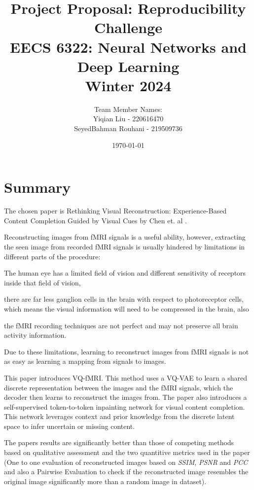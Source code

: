 \documentclass[11pt,a4paper]{article}
\title{Project Proposal: Reproducibility Challenge \\ \large EECS 6322: Neural Networks and Deep Learning \\ Winter 2024}
\author{Team Member Names: \\
        Yiqian Liu - 220616470 \\
        SeyedBahman Rouhani - 219509736}
\date{\today}
\begin{document}
\maketitle

\section*{Summary}
The chosen paper is Rethinking Visual Reconstruction: Experience-Based Content Completion
Guided by Visual Cues by Chen et. al \cite{chen2023rethinking}.

Reconstructing images from fMRI signals is a useful ability, however, extracting the seen image from recorded fMRI signals is usually hindered by limitations in different parts of the procedure: 
\begin{enumerate*}
  \item The human eye has a limited field of vision and different sensitivity of receptors inside that field of vision,
  \item there are far less ganglion cells in the brain with respect to photoreceptor cells, which means the visual information will need to be compressed in the brain, also
  \item the fMRI recording techniques are not perfect and may not preserve all brain activity information.
\end{enumerate*}
Due to these limitations, learning to reconstruct images from fMRI signals is not as easy as learning a mapping from signals to images. 

This paper introduces VQ-fMRI. This method uses a VQ-VAE to learn a shared discrete representation between the images and the fMRI signals, which the decoder then learns to reconstruct the images from.
The paper also introduces a self-supervised token-to-token inpainting network for visual content completion. This network leverages context and prior knowledge from the discrete latent space to infer uncertain or missing content.

The papers results are significantly better than those of competing methods based on qualitative assessment and the two quantitive metrics used in the paper (One to one evaluation of reconstructed images based on \textit{SSIM}, \textit{PSNR} and \textit{PCC} and also a Pairwise Evaluation to check if the reconstructed image resembles the original image significantly more than a random image in dataset).
 
%
\end{document}
